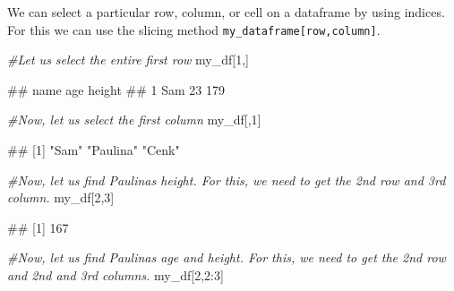 \documentclass[
]{book}
\newenvironment{Shaded}{\begin{snugshade}}{\end{snugshade}}
\newcommand{\CommentTok}[1]{\textcolor[rgb]{0.56,0.35,0.01}{\textit{#1}}}
\newcommand{\DecValTok}[1]{\textcolor[rgb]{0.00,0.00,0.81}{#1}}
\newcommand{\NormalTok}[1]{#1}
\newcommand{\SpecialCharTok}[1]{\textcolor[rgb]{0.00,0.00,0.00}{#1}}
\begin{document}
We can select a particular row, column, or cell on a dataframe by using indices. For this we can use the slicing method \texttt{my\_dataframe{[}row,column{]}}.

\begin{Shaded}
\begin{Highlighting}[]
\CommentTok{\#Let us select the entire first row }
\NormalTok{my\_df[}\DecValTok{1}\NormalTok{,]}
\end{Highlighting}
\end{Shaded}

\begin{Shaded}
\begin{Highlighting}[]
\NormalTok{\#\#   name age height}
\NormalTok{\#\# 1  Sam  23    179}
\end{Highlighting}
\end{Shaded}

\begin{Shaded}
\begin{Highlighting}[]
\CommentTok{\#Now, let us select the first column }
\NormalTok{my\_df[,}\DecValTok{1}\NormalTok{]}
\end{Highlighting}
\end{Shaded}

\begin{Shaded}
\begin{Highlighting}[]
\NormalTok{\#\# [1] "Sam"     "Paulina" "Cenk"}
\end{Highlighting}
\end{Shaded}

\begin{Shaded}
\begin{Highlighting}[]
\CommentTok{\#Now, let us find Paulina\textquotesingle{}s height. For this, we need to get the 2nd row and 3rd column.}
\NormalTok{my\_df[}\DecValTok{2}\NormalTok{,}\DecValTok{3}\NormalTok{]}
\end{Highlighting}
\end{Shaded}

\begin{Shaded}
\begin{Highlighting}[]
\NormalTok{\#\# [1] 167}
\end{Highlighting}
\end{Shaded}

\begin{Shaded}
\begin{Highlighting}[]
\CommentTok{\#Now, let us find Paulina\textquotesingle{}s age and height. For this, we need to get the 2nd row and 2nd and 3rd columns.}
\NormalTok{my\_df[}\DecValTok{2}\NormalTok{,}\DecValTok{2}\SpecialCharTok{:}\DecValTok{3}\NormalTok{]}
\end{Highlighting}
\end{Shaded}
\end{document}
